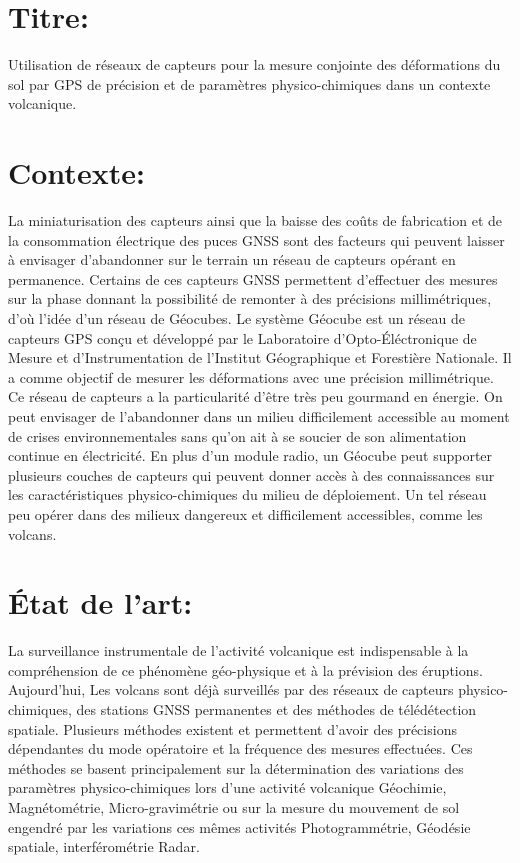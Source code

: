 \documentclass{themeensg}
\begin{document}
\newevenpage
\begin{appendices} 
\label{beginappendices}
\label{annexekalman}
\section*{Titre:}
Utilisation de réseaux de capteurs pour la mesure conjointe des déformations du sol par GPS de précision et de paramètres physico-chimiques dans un contexte volcanique.
\section*{Contexte:}
La miniaturisation des capteurs ainsi que la baisse des coûts de fabrication et de la consommation électrique des puces GNSS sont des facteurs qui peuvent laisser à envisager d'abandonner sur le terrain un réseau de capteurs opérant en permanence. Certains de ces capteurs GNSS permettent d'effectuer des mesures sur la phase donnant la possibilité de remonter à des précisions millimétriques, d'où l'idée d'un réseau de Géocubes. Le système Géocube est un réseau de capteurs GPS conçu et développé par le Laboratoire d'Opto-Éléctronique de Mesure et d'Instrumentation de l'Institut Géographique et Forestière Nationale. Il a comme objectif de mesurer les déformations avec une précision millimétrique. Ce réseau de capteurs a la particularité d'être très peu gourmand en énergie. On peut envisager de l'abandonner dans un milieu difficilement accessible au moment de crises environnementales sans qu'on ait à se soucier de son alimentation continue en électricité. En plus d'un module radio, un Géocube peut supporter plusieurs couches de capteurs qui peuvent donner accès à des connaissances sur les caractéristiques physico-chimiques du milieu de déploiement. Un tel réseau peu opérer dans des milieux dangereux et difficilement accessibles, comme les volcans.

\section*{État de l'art:}

La surveillance instrumentale de l'activité volcanique est indispensable à la compréhension de ce phénomène géo-physique et à la prévision des éruptions. Aujourd'hui, Les volcans sont déjà surveillés par des réseaux de capteurs physico-chimiques, des stations GNSS permanentes et des méthodes de télédétection spatiale. Plusieurs méthodes existent et permettent d'avoir des précisions dépendantes du mode opératoire et la fréquence des mesures effectuées. Ces méthodes se basent principalement sur la détermination des variations des paramètres physico-chimiques lors d'une activité volcanique Géochimie, Magnétométrie, Micro-gravimétrie ou sur la mesure du mouvement de sol engendré par les variations ces mêmes activités Photogrammétrie, Géodésie spatiale, interférométrie Radar.


\end{appendices}
\end{document}
